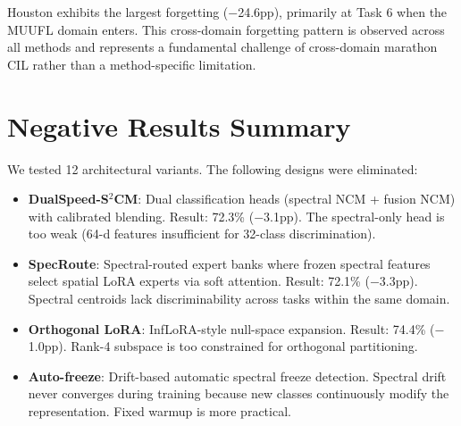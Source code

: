Houston exhibits the largest forgetting ($-$24.6pp), primarily at Task 6 when the MUUFL domain enters. This cross-domain forgetting pattern is observed across all methods and represents a fundamental challenge of cross-domain marathon CIL rather than a method-specific limitation.

\section{Negative Results Summary}
\label{app:negative}

We tested 12 architectural variants. The following designs were eliminated:
\begin{itemize}
    \item \textbf{DualSpeed-S$^2$CM}: Dual classification heads (spectral NCM + fusion NCM) with calibrated blending. Result: 72.3\% ($-$3.1pp). The spectral-only head is too weak (64-d features insufficient for 32-class discrimination).
    \item \textbf{SpecRoute}: Spectral-routed expert banks where frozen spectral features select spatial LoRA experts via soft attention. Result: 72.1\% ($-$3.3pp). Spectral centroids lack discriminability across tasks within the same domain.
    \item \textbf{Orthogonal LoRA}: InfLoRA-style null-space expansion. Result: 74.4\% ($-$1.0pp). Rank-4 subspace is too constrained for orthogonal partitioning.
    \item \textbf{Auto-freeze}: Drift-based automatic spectral freeze detection. Spectral drift never converges during training because new classes continuously modify the representation. Fixed warmup is more practical.
\end{itemize}
